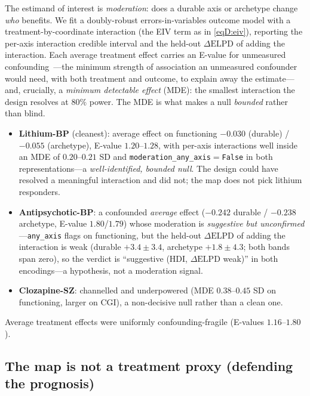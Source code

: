 The estimand of interest is \emph{moderation}: does a durable axis or archetype change
\emph{who} benefits. We fit a doubly-robust errors-in-variables outcome model with a
treatment-by-coordinate interaction (the EIV term as in \eqref{eqD:eiv}), reporting the
per-axis interaction credible interval and the held-out $\Delta\mathrm{ELPD}$ of adding
the interaction. Each average treatment effect carries an E-value for unmeasured
confounding~\citep{vanderweele2017evalue}---the minimum strength of association an
unmeasured confounder would need, with both treatment and outcome, to explain away the
estimate---and, crucially, a \emph{minimum detectable effect} (MDE): the smallest
interaction the design resolves at $80\%$ power. The MDE is what makes a null
\emph{bounded} rather than blind.
\begin{itemize}
  \item \textbf{Lithium-BP} (cleanest): average effect on functioning $-0.030$ (durable)
  / $-0.055$ (archetype), E-value $1.20$--$1.28$, with per-axis interactions well inside
  an MDE of $0.20$--$0.21$ SD and \texttt{moderation\_any\_axis}$=$\texttt{False} in both
  representations---a \emph{well-identified, bounded null}. The design could have resolved
  a meaningful interaction and did not; the map does not pick lithium responders.
  \item \textbf{Antipsychotic-BP}: a confounded \emph{average} effect ($-0.242$ durable /
  $-0.238$ archetype, E-value $1.80$/$1.79$) whose moderation is \emph{suggestive but
  unconfirmed}---\texttt{any\_axis} flags on functioning, but the held-out
  $\Delta\mathrm{ELPD}$ of adding the interaction is weak (durable $+3.4\pm3.4$, archetype
  $+1.8\pm4.3$; both bands span zero), so the verdict is ``suggestive (HDI,
  $\Delta\mathrm{ELPD}$ weak)'' in both encodings---a hypothesis, not a moderation signal.
  \item \textbf{Clozapine-SZ}: channelled and underpowered (MDE $0.38$--$0.45$ SD on
  functioning, larger on CGI), a non-decisive null rather than a clean one.
\end{itemize}
Average treatment effects were uniformly confounding-fragile (E-values $1.16$--$1.80$).

\subsection{The map is not a treatment proxy (defending the prognosis)}

